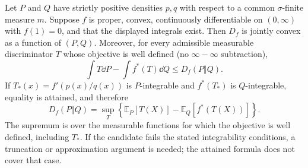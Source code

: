 \documentclass[12pt,a4paper,oneside]{book}
\begin{document}
\begin{theorem}
\label{thm:f-variational}
\label{src:p11q9}
Let $P$ and $Q$ have strictly positive densities $p,q$ with respect
to a common $\sigma$-finite measure $m$. Suppose $f$ is proper, convex,
continuously differentiable on $(0,\infty)$ with $f(1)=0$, and
that the displayed integrals exist. Then $D_f$ is jointly convex
as a function of $(P,Q)$. Moreover, for every admissible
measurable discriminator $T$ whose objective is well defined
(no $\infty-\infty$ subtraction),
\begin{equation*}
\int T\dd P-\int f^*(T)\dd Q\le D_f(P\Vert Q).
\end{equation*}
If $T_*(x)=f'(p(x)/q(x))$ is $P$-integrable and
$f^*(T_*)$ is $Q$-integrable, equality is attained, and therefore
\begin{equation*}
\boxed{D_f(P\Vert Q)
 =\sup_T\left\{\mathbb E_P[T(X)]
                -\mathbb E_Q[f^*(T(X))]\right\}.}
\end{equation*}
The supremum is over the measurable functions for which the
objective is well defined, including $T_*$. If the candidate fails
the stated integrability conditions, a truncation or approximation
argument is needed; the attained formula does not cover that case.
\end{theorem}
\end{document}
